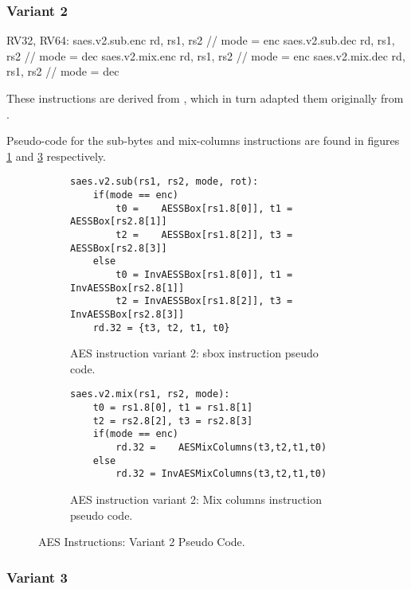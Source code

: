 \subsubsection{Variant 2}

\begin{cryptoisa}
RV32, RV64:
    saes.v2.sub.enc    rd, rs1, rs2 // mode = enc
    saes.v2.sub.dec    rd, rs1, rs2 // mode = dec
    saes.v2.mix.enc    rd, rs1, rs2 // mode = enc
    saes.v2.mix.dec    rd, rs1, rs2 // mode = dec
\end{cryptoisa}

These instructions are derived from \cite{MPP:19}, which in turn adapted
them originally from \cite{TG:06}.

Pseudo-code for the sub-bytes and mix-columns instructions are found in
figures
\ref{fig:pesudo:aes:v2:sub}
and
\ref{fig:pesudo:aes:v2:mix}
respectively.

\begin{figure}
\begin{subfigure}[b]{1.0\textwidth}
\begin{lstlisting}
saes.v2.sub(rs1, rs2, mode, rot):
    if(mode == enc)
        t0 =    AESSBox[rs1.8[0]], t1 =    AESSBox[rs2.8[1]]
        t2 =    AESSBox[rs1.8[2]], t3 =    AESSBox[rs2.8[3]]
    else
        t0 = InvAESSBox[rs1.8[0]], t1 = InvAESSBox[rs2.8[1]]
        t2 = InvAESSBox[rs1.8[2]], t3 = InvAESSBox[rs2.8[3]]
    rd.32 = {t3, t2, t1, t0} 
\end{lstlisting}
\caption{AES instruction variant 2: sbox instruction pseudo code.}
\label{fig:pesudo:aes:v2:sub}
\end{subfigure}
\begin{subfigure}[b]{1.0\textwidth}
\begin{lstlisting}
saes.v2.mix(rs1, rs2, mode):
    t0 = rs1.8[0], t1 = rs1.8[1]
    t2 = rs2.8[2], t3 = rs2.8[3]
    if(mode == enc)
        rd.32 =    AESMixColumns(t3,t2,t1,t0)
    else
        rd.32 = InvAESMixColumns(t3,t2,t1,t0)
\end{lstlisting}
\caption{AES instruction variant 2: Mix columns instruction pseudo code.}
\label{fig:pesudo:aes:v2:mix}
\end{subfigure}
\caption{AES Instructions: Variant 2 Pseudo Code.}
\end{figure}

\subsubsection{Variant 3}

